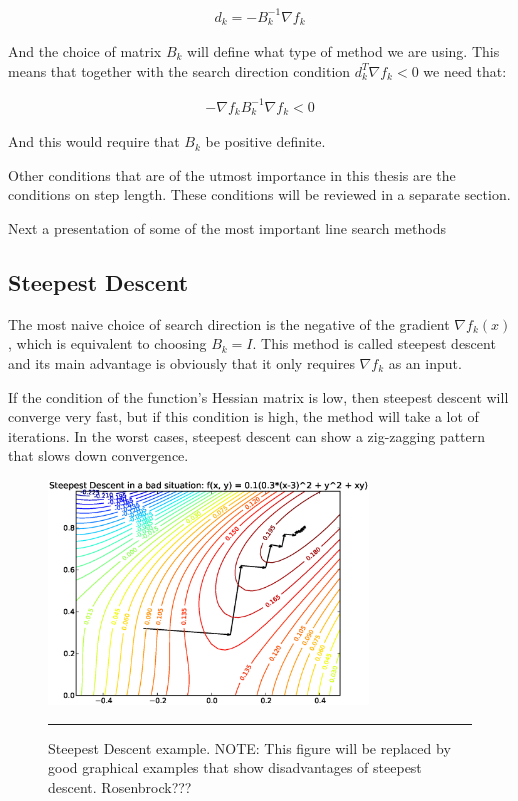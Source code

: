\begin{equation} \label{searchdirection}
    \begin{aligned}
      d_k = -B_{k}^{-1} \nabla f_k
    \end{aligned}
\end{equation}
 
And the choice of matrix $B_k$ will define what type of method we are using.  This means that together with the search direction condition $d_k^T \nabla f_k < 0$ we need that:

\begin{equation} \label{Bposdef}
  \begin{aligned}
    -\nabla f_k B_k^{-1} \nabla f_k < 0
  \end{aligned}
\end{equation}

And this would require that $B_k$ be positive definite.

Other conditions that are of the utmost importance in this thesis are the conditions on step length.  These conditions will be reviewed in a separate section.  
 
Next a presentation of some  of the most important line search methods

\subsection{Steepest Descent}

The most naive choice of search direction is the negative of the gradient $\nabla f_k(x)$, which is equivalent to choosing $B_k = I$.  This method is called steepest descent and its main advantage is obviously that it only requires $\nabla f_k$ as an input.

If the condition of the function's Hessian matrix is low, then steepest descent will converge very fast,  but if this condition is high, the method will take a lot of iterations.  In the worst cases, steepest descent can show a zig-zagging pattern that slows down convergence.

\begin{figure}[htbp]
  \centering
  \includegraphics[width=8.5cm]{Figures/steepestDescentUgly}
  \rule{35em}{0.1pt}
  \caption[step. Desc.]{Steepest Descent example.  NOTE: This figure will be replaced by good graphical examples that show disadvantages of steepest descent. Rosenbrock???}
  \label{fig:steepestdescent}
\end{figure}


